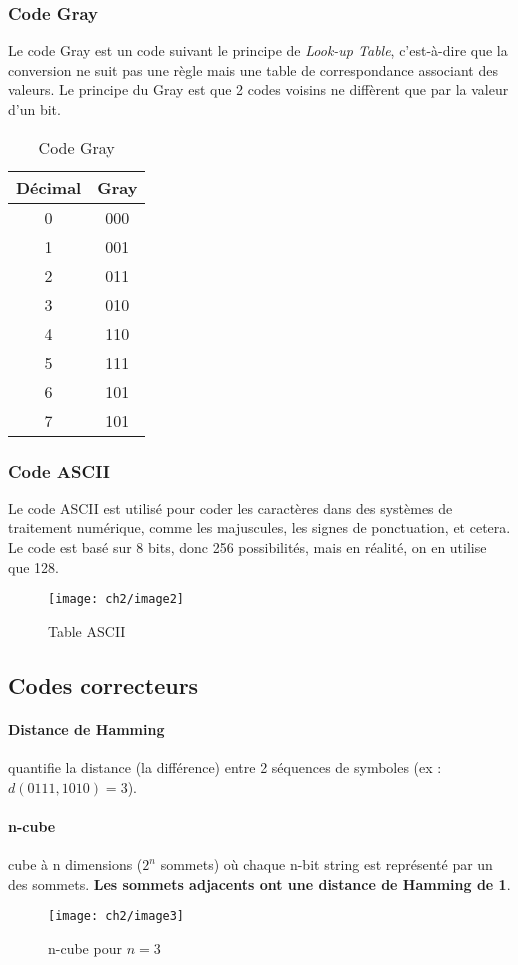 \subsubsection{Code Gray}
Le code Gray est un code suivant le principe de \textit{Look-up Table}, c'est-à-dire que la conversion ne suit pas une règle mais une table de correspondance associant des valeurs. Le principe du Gray est que 2 codes voisins ne diffèrent que par la valeur d'un bit.
\begin{table}[H]
	\centering
	\begin{tabular}{c|c}
		Décimal & Gray \\
		\hline
		0 & 000\\
		 \hline
		1 & 001\\
		 \hline
		2 & 011\\
		 \hline
		3 & 010\\
		 \hline
		4 & 110\\
		 \hline
		5 & 111\\
		 \hline
		6 & 101\\
		 \hline
		7 & 101		 
	\end{tabular}
	\caption{Code Gray}
\end{table}
\subsubsection{Code ASCII}
Le code ASCII est utilisé pour coder les caractères dans des systèmes de traitement numérique, comme les majuscules, les signes de ponctuation, et cetera. Le code est basé sur 8 bits, donc 256 possibilités, mais en réalité, on en utilise que 128.
\begin{figure}[H]
	\centering
	\texttt{[image: ch2/image2]}
	\caption{Table ASCII}
\end{figure}
\subsection{Codes correcteurs}
\paragraph{Distance de Hamming} quantifie la distance (la différence) entre 2 séquences de symboles (ex : $d(0111,1010)=3$).
\paragraph{n-cube} cube à n dimensions ($2^n$ sommets) où chaque n-bit string est représenté par un des sommets. \textbf{Les sommets adjacents ont une distance de Hamming de 1}.
\begin{figure}[H]
	\centering
	\texttt{[image: ch2/image3]}
	\caption{n-cube pour $n=3$}
\end{figure}
